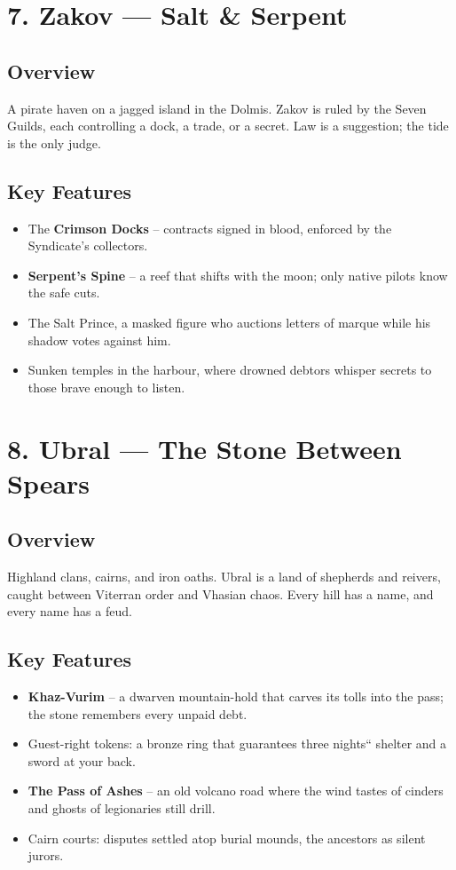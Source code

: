 \documentclass[11pt]{article}
\begin{document}
\section*{7. Zakov --- Salt \& Serpent}

\subsection*{Overview}
A pirate haven on a jagged island in the Dolmis. Zakov is ruled by the Seven Guilds, each controlling a dock, a trade, or a secret. Law is a suggestion; the tide is the only judge.

\subsection*{Key Features}
\begin{itemize}[leftmargin=*]
    \item The \textbf{Crimson Docks} -- contracts signed in blood, enforced by the Syndicate's collectors.
    \item \textbf{Serpent's Spine} -- a reef that shifts with the moon; only native pilots know the safe cuts.
    \item The Salt Prince, a masked figure who auctions letters of marque while his shadow votes against him.
    \item Sunken temples in the harbour, where drowned debtors whisper secrets to those brave enough to listen.
\end{itemize}

\section*{8. Ubral --- The Stone Between Spears}

\subsection*{Overview}
Highland clans, cairns, and iron oaths. Ubral is a land of shepherds and reivers, caught between Viterran order and Vhasian chaos. Every hill has a name, and every name has a feud.

\subsection*{Key Features}
\begin{itemize}[leftmargin=*]
    \item \textbf{Khaz-Vurim} -- a dwarven mountain-hold that carves its tolls into the pass; the stone remembers every unpaid debt.
    \item Guest-right tokens: a bronze ring that guarantees three nights`` shelter and a sword at your back.
    \item \textbf{The Pass of Ashes} -- an old volcano road where the wind tastes of cinders and ghosts of legionaries still drill.
    \item Cairn courts: disputes settled atop burial mounds, the ancestors as silent jurors.
\end{itemize}
\end{document}
